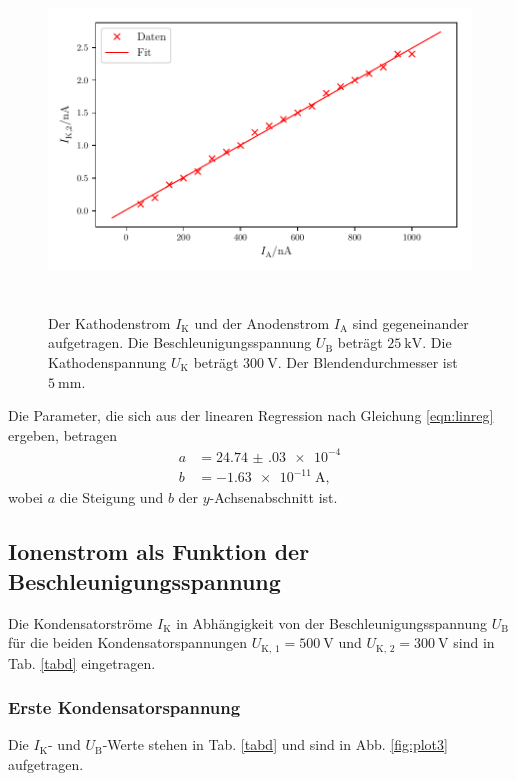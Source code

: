 \begin{figure}
    \centering
    \includegraphics[width=15cm, height=9cm]{build/plot2.pdf}
    \caption{Der Kathodenstrom $I_\text{K}$ und der Anodenstrom $I_\text{A}$ sind gegeneinander aufgetragen. Die Beschleunigungsspannung $U_\text{B}$ beträgt $\SI{25}{\kilo\volt}$. Die Kathodenspannung $U_\text{K}$ beträgt $\SI{300}{\volt}$. Der Blendendurchmesser ist $\SI{5}{\milli\meter}.$}
    \label{fig:plot2}
\end{figure}

\noindent Die Parameter, die sich aus der linearen Regression nach Gleichung \eqref{eqn:linreg} ergeben, betragen
\begin{align*}
    a &= \num{24.74(03)e-4}\\
    b &= \SI{-1.63e-11}{\ampere},
\end{align*}
wobei $a$ die Steigung und $b$ der $y$-Achsenabschnitt ist. 



\subsection{Ionenstrom als Funktion der Beschleunigungsspannung}

Die Kondensatorströme $I_\text{K}$ in Abhängigkeit von der
Beschleunigungsspannung $U_\text{B}$ für die beiden Kondensatorspannungen
$U_\text{K, 1} = \SI{500}{\volt}$ und $U_\text{K, 2} = \SI{300}{\volt}$
sind in Tab. \ref{tabd} eingetragen.

\subsubsection{Erste Kondensatorspannung}
Die $I_\text{K}$- und $U_\text{B}$-Werte stehen in Tab. \ref{tabd} und sind in Abb. \ref{fig:plot3} aufgetragen. 

